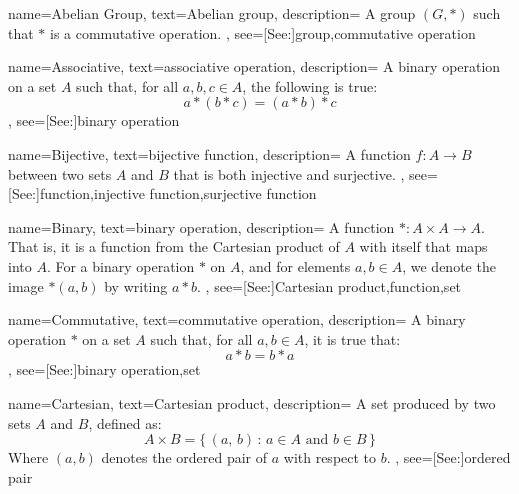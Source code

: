 {
    name={Abelian Group},
    text={Abelian group},
    description={
        A group $(G,*)$ such that $*$ is a commutative operation.
    },
    see=[See:]{group,commutative operation}
}

{
    name={Associative},
    text={associative operation},
    description={
        A binary operation on a set $A$ such that, for all $a,b,c\in{A}$,
        the following is true:
        \begin{equation*}
            a*(b*c)=(a*b)*c
        \end{equation*}
    },
    see=[See:]{binary operation}
}

{
    name={Bijective},
    text={bijective function},
    description={
        A function $f:A\rightarrow{B}$ between two sets $A$ and $B$ that
        is both injective and surjective.
    },
    see=[See:]{function,injective function,surjective function}
}

{
    name={Binary},
    text={binary operation},
    description={
        A function $*:A\times{A}\rightarrow{A}$. That is, it is a function
        from the Cartesian product of $A$ with itself that maps into $A$.
        For a binary operation $*$ on $A$, and for elements $a,b\in{A}$,
        we denote the image $*(a,b)$ by writing $a*b$.
    },
    see=[See:]{Cartesian product,function,set}
}

{
    name={Commutative},
    text={commutative operation},
    description={
        A binary operation $*$ on a set $A$ such that, for all $a,b\in{A}$,
        it is true that:
        \begin{equation}
            a*b=b*a
        \end{equation}
    },
    see=[See:]{binary operation,set}
}

{
    name={Cartesian},
    text={Cartesian product},
    description={
        A set produced by two sets $A$ and $B$, defined as:
        \begin{equation*}
            A\times{B}=\{\,(a,\,b)\,:\,a\in{A}\textrm{ and }b\in{B}\,\}
        \end{equation*}
        Where $(a,b)$ denotes the ordered pair of $a$ with respect to $b$.
    },
    see=[See:]{ordered pair}
}

